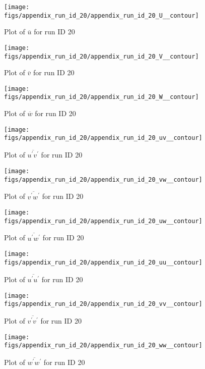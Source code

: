 \begin{figure}[H]
\centering
\texttt{[image: figs/appendix\_run\_id\_20/appendix\_run\_id\_20\_U\_\_contour]}
\caption{Plot of $\overline{u}$ for run ID 20}
\label{fig:appendix_run_id_20_U__contour}
\end{figure}


\begin{figure}[H]
\centering
\texttt{[image: figs/appendix\_run\_id\_20/appendix\_run\_id\_20\_V\_\_contour]}
\caption{Plot of $\overline{v}$ for run ID 20}
\label{fig:appendix_run_id_20_V__contour}
\end{figure}


\begin{figure}[H]
\centering
\texttt{[image: figs/appendix\_run\_id\_20/appendix\_run\_id\_20\_W\_\_contour]}
\caption{Plot of $\overline{w}$ for run ID 20}
\label{fig:appendix_run_id_20_W__contour}
\end{figure}


\begin{figure}[H]
\centering
\texttt{[image: figs/appendix\_run\_id\_20/appendix\_run\_id\_20\_uv\_\_contour]}
\caption{Plot of $\overline{u^\prime v^\prime}$ for run ID 20}
\label{fig:appendix_run_id_20_uv__contour}
\end{figure}


\begin{figure}[H]
\centering
\texttt{[image: figs/appendix\_run\_id\_20/appendix\_run\_id\_20\_vw\_\_contour]}
\caption{Plot of $\overline{v^\prime w^\prime}$ for run ID 20}
\label{fig:appendix_run_id_20_vw__contour}
\end{figure}


\begin{figure}[H]
\centering
\texttt{[image: figs/appendix\_run\_id\_20/appendix\_run\_id\_20\_uw\_\_contour]}
\caption{Plot of $\overline{u^\prime w^\prime}$ for run ID 20}
\label{fig:appendix_run_id_20_uw__contour}
\end{figure}


\begin{figure}[H]
\centering
\texttt{[image: figs/appendix\_run\_id\_20/appendix\_run\_id\_20\_uu\_\_contour]}
\caption{Plot of $\overline{u^\prime u^\prime}$ for run ID 20}
\label{fig:appendix_run_id_20_uu__contour}
\end{figure}


\begin{figure}[H]
\centering
\texttt{[image: figs/appendix\_run\_id\_20/appendix\_run\_id\_20\_vv\_\_contour]}
\caption{Plot of $\overline{v^\prime v^\prime}$ for run ID 20}
\label{fig:appendix_run_id_20_vv__contour}
\end{figure}


\begin{figure}[H]
\centering
\texttt{[image: figs/appendix\_run\_id\_20/appendix\_run\_id\_20\_ww\_\_contour]}
\caption{Plot of $\overline{w^\prime w^\prime}$ for run ID 20}
\label{fig:appendix_run_id_20_ww__contour}
\end{figure}


